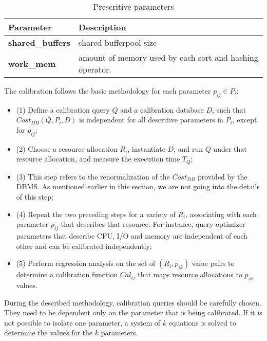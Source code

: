 \begin{table}[ht]
    \centering
    \begin{tabular}{ | l | p{5cm} |}
    \hline
      Parameter & Description  \\ \hline
    \textbf{shared\_buffers} & shared bufferpool size \\ \hline
    \textbf{work\_mem} & amount of memory used by each sort and hashing operator. \\
    \hline
    \end{tabular}
    \caption{Prescritive parameters}
    \label{table:prescritive}
\end{table}

The calibration follows the basic methodology for each parameter $p_{ij} \in P_{i}$:

\begin{itemize}
 \item (1) Define a calibration query $Q$ and a calibration database $D$, such that $Cost_{DB}(Q,P_{i},D)$ is independent for all descritive parameters in $P_{i}$, except for $p_{ij}$; \\
  \item (2) Choose a resource allocation $R_{i}$, instantiate $D$, and run $Q$ under that resource allocation, and measure the execution time $T_{Q}$; \\
  \item (3) This step refers to the renormalization of the $Cost_{DB}$ provided by the DBMS. As mentioned earlier in this section, we are not going into the details of this step; \\
  \item (4) Repeat the two preceding steps for a variety of $R_{i}$, associating with each parameter $p_{ij}$ that describes that resource. For instance, query optimizer parameters that describe CPU, I/O and memory are independent of each other and can be calibrated independently; \\
  \item (5) Perform regression analysis on the set of $(R_{i},p_{ik})$ value pairs to determine a calibration function $Cal_{ij}$ that maps resource allocations to $p_{ik}$ values. \\
\end{itemize}

During the described methodology, calibration queries should be carefully chosen. They need to be dependent only on the parameter that is being calibrated. If it is not possible to isolate one parameter, a system of $k$ equations is solved to determine the values for the $k$ parameters.


